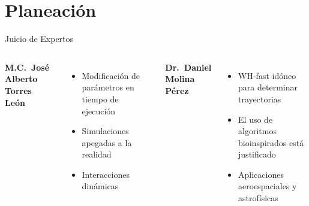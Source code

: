 \section{Planeación}

\begin{frame}{Juicio de Expertos}
  \begin{columns}[T]
    \textbf{M.C.\ José Alberto Torres León}
    \begin{itemize}
      \item Modificación de parámetros en tiempo de ejecución
      \item Simulaciones apegadas a la realidad
      \item Interacciones dinámicas
    \end{itemize}
    \textbf{Dr.\ Daniel Molina Pérez}
       \begin{itemize}
         \item WH-fast idóneo para determinar trayectorias
         \item El uso de algoritmos bioinspirados está justificado
         \item Aplicaciones aeroespaciales y astrofísicas
       \end{itemize}
   \end{columns}
 \end{frame}






